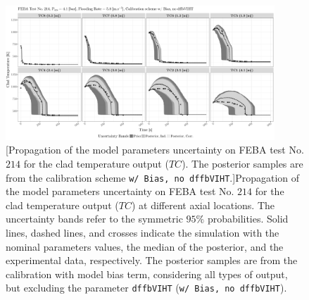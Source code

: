 \clearpage
\begin{figure}
	\centering
	\includegraphics[width=0.90\textwidth]{../figures/chapter5/figures/plotTraceUQPosteriorAllDiscCenteredNoParam8TC214}
		[Propagation of the model parameters uncertainty on FEBA test No. $214$ for the clad temperature output ($TC$). The posterior samples are from the calibration scheme \texttt{w/ Bias, no dffbVIHT}.]{Propagation of the model parameters uncertainty on FEBA test No. $214$ for the clad temperature output ($TC$) at different axial locations. The uncertainty bands refer to the symmetric $95\%$ probabilities. Solid lines, dashed lines, and crosses indicate the simulation with the nominal parameters values, the median of the posterior, and the experimental data, respectively. The posterior samples are from the calibration with model bias term, considering all types of output, but excluding the parameter \texttt{dffbVIHT} (\texttt{w/ Bias, no dffbVIHT}).}
	\label{fig:ch5_plot_trace_uq_post_tc_214_noparam8}
\end{figure}
\clearpage

